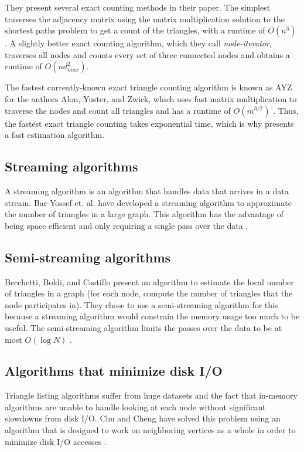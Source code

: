 \documentclass{acm_proc_article-sp}
\begin{document}
They present several exact counting methods in their paper. The simplest
traverses
the adjacency matrix using the matrix multiplication solution to the shortest
paths problem to get a count of the triangles, with a runtime of $O(n^3)$
\cite{schank:counting}. A slightly better exact counting algorithm, which they
call \textit{node-iterator}, traverses all nodes and counts every
set of three connected nodes and obtains a runtime of $O(nd_{max}^2)$.

The fastest currently-known exact triangle counting algorithm is known as AYZ
for the authors Alon, Yuster, and Zwick, which uses fast matrix multiplication
to traverse the nodes and count all triangles and has a runtime of $O(m^{3/2})$
\cite{ayz}. Thus, the fastest exact triangle counting takes exponential time,
which is why \cite{original} presents a fast estimation algorithm.

\subsection{Streaming algorithms}
A streaming algorithm is an algorithm that handles data that arrives in a
data stream. Bar-Yossef et. al. have developed a streaming algorithm to
approximate the number of triangles in a large graph. This algorithm has the
advantage of being space efficient and only requiring a single pass over the
data \cite{baryossef}. 

\subsection{Semi-streaming algorithms}
Becchetti, Boldi, and Castillo present an algorithm to estimate the local
number of triangles in a graph (for each node, compute the number of triangles
that the node participates in). They chose to use a semi-streaming algorithm
for this because a streaming algorithm would constrain the memory usage too
much to be useful. The semi-streaming algorithm limits the passes over the data
to be at most $O(\log N)$ \cite{becchetti}.

\subsection{Algorithms that minimize disk I/O}
Triangle listing algorithms suffer from huge datasets and the fact that
in-memory algorithms are unable to handle looking at each node without
significant slowdowns from disk I/O. Chu and Cheng have solved this problem
using an algorithm that is designed to work on neighboring vertices as a whole
in order to minimize disk I/O accesses \cite{chu}.
\end{document}
